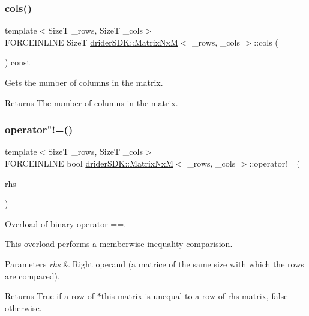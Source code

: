\subsubsection{\texorpdfstring{cols()}{cols()}}
{\footnotesize\ttfamily template$<$SizeT \+\_\+rows, SizeT \+\_\+cols$>$ \\
F\+O\+R\+C\+E\+I\+N\+L\+I\+NE SizeT \hyperlink{classdrider_s_d_k_1_1_matrix_nx_m}{drider\+S\+D\+K\+::\+Matrix\+NxM}$<$ \+\_\+rows, \+\_\+cols $>$\+::cols (\begin{DoxyParamCaption}{ }\end{DoxyParamCaption}) const\hspace{0.3cm}{\ttfamily [inline]}}

Gets the number of columns in the matrix.

\begin{DoxyReturn}{Returns}
The number of columns in the matrix. 
\end{DoxyReturn}
\mbox{\label{classdrider_s_d_k_1_1_matrix_nx_m_a308f6fe8d904bafea034dd30325e95ee}} 
\subsubsection{\texorpdfstring{operator"!=()}{operator!=()}}
{\footnotesize\ttfamily template$<$SizeT \+\_\+rows, SizeT \+\_\+cols$>$ \\
F\+O\+R\+C\+E\+I\+N\+L\+I\+NE bool \hyperlink{classdrider_s_d_k_1_1_matrix_nx_m}{drider\+S\+D\+K\+::\+Matrix\+NxM}$<$ \+\_\+rows, \+\_\+cols $>$\+::operator!= (\begin{DoxyParamCaption}\item[{const \hyperlink{classdrider_s_d_k_1_1_matrix_nx_m}{Matrix\+NxM}$<$ \+\_\+rows, \+\_\+cols $>$ \&}]{rhs }\end{DoxyParamCaption})\hspace{0.3cm}{\ttfamily [inline]}}

Overload of binary operator ==.

This overload performs a memberwise inequality comparision.


\begin{DoxyParams}{Parameters}
{\em rhs} & Right operand (a matrice of the same size with which the rows are compared).\\
\hline
\end{DoxyParams}
\begin{DoxyReturn}{Returns}
True if a row of $\ast$this matrix is unequal to a row of rhs matrix, false otherwise. 
\end{DoxyReturn}
\mbox{\label{classdrider_s_d_k_1_1_matrix_nx_m_aa90e6b889b38164908ca36a23e86b89a}} 
